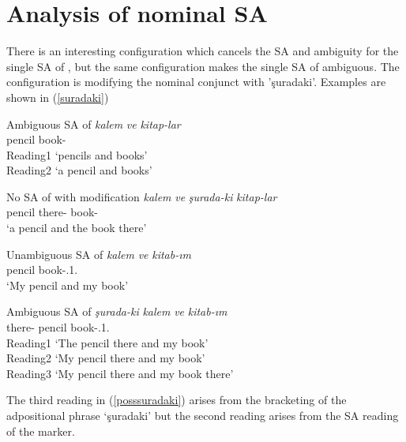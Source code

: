 \section{Analysis of nominal SA}

There is an interesting configuration which cancels the SA and ambiguity for the single SA of {\Pl}, but the same configuration makes the single SA of {\Poss} ambiguous. The configuration is modifying the nominal conjunct with 'şuradaki'. Examples are shown in (\ref{suradaki})

\begin{exe}
    \ex \label{suradaki}
    \begin{xlist}
        \ex 
        \begin{xlisti}
           \sn Ambiguous SA of {\Pl}
           \ex \gll \textit{kalem} \textit{ve} \textit{kitap-lar} \\ pencil {\And} book-{\Pl} \\
           \glt Reading1 `pencils and books' \\ Reading2 `a pencil and books'
           
           \sn No SA of {\Pl} with modification
           \ex \gll \textit{kalem} \textit{ve} \textit{şurada-ki} \textit{kitap-lar} \\ pencil {\And} there-{\Adp} book-{\Pl} \\
           \glt `a pencil and the book there'
        \end{xlisti}
        
        \ex 
        \begin{xlisti}
            \sn Unambiguous SA of {\Poss}
            \ex \gll \textit{kalem} \textit{ve} \textit{kitab-ım} \\ pencil {\And} book-{\Poss}.1.{\Sg} \\
            \glt `My pencil and my book'
            
            \sn Ambiguous SA of {\Poss}
            \ex \label{posssuradaki}\gll \textit{şurada-ki} \textit{kalem} \textit{ve} \textit{kitab-ım} \\ there-{\Adp} pencil {\And} book-{\Poss}.1.{\Sg} \\
            \glt Reading1 `The pencil there and my book' \\ Reading2 `My pencil there and my book' \\ Reading3 `My pencil there and my book there'
        \end{xlisti}
    \end{xlist}
\end{exe}

The third reading in (\ref{posssuradaki}) arises from the bracketing of the adpositional phrase `şuradaki' but the second reading arises from the SA reading of the {\Poss} marker.